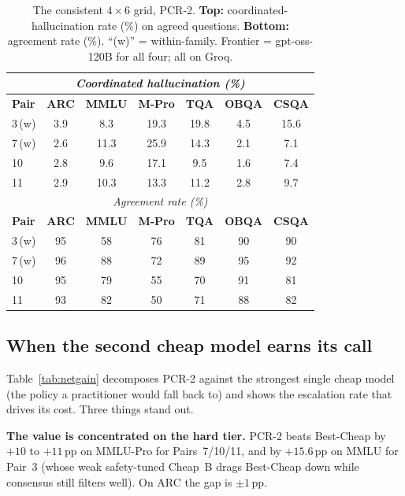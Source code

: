 \documentclass[conference]{IEEEtran}
\begin{document}
\begin{table}[!t]
\caption{The consistent $4\times6$ grid, PCR-2. \textbf{Top:}
coordinated-hallucination rate (\%) on agreed questions. \textbf{Bottom:}
agreement rate (\%). ``(w)'' = within-family. Frontier = gpt-oss-120B for all
four; all on Groq.}
\label{tab:percell}
\renewcommand{\arraystretch}{1.2}
\footnotesize
\setlength{\tabcolsep}{5pt}
\begin{tabular}{l c c c c c c}
\toprule
\multicolumn{7}{c}{\textit{Coordinated hallucination (\%)}} \\
\midrule
\textbf{Pair} & \textbf{ARC} & \textbf{MMLU} & \textbf{M-Pro} & \textbf{TQA} & \textbf{OBQA} & \textbf{CSQA} \\
\midrule
3\,{\footnotesize(w)} & 3.9 & 8.3 & 19.3 & 19.8 & 4.5 & 15.6 \\
7\,{\footnotesize(w)} & 2.6 & 11.3 & 25.9 & 14.3 & 2.1 & 7.1 \\
10 & 2.8 & 9.6 & 17.1 & 9.5 & 1.6 & 7.4 \\
11 & 2.9 & 10.3 & 13.3 & 11.2 & 2.8 & 9.7 \\
\midrule
\multicolumn{7}{c}{\textit{Agreement rate (\%)}} \\
\midrule
\textbf{Pair} & \textbf{ARC} & \textbf{MMLU} & \textbf{M-Pro} & \textbf{TQA} & \textbf{OBQA} & \textbf{CSQA} \\
\midrule
3\,{\footnotesize(w)} & 95 & 58 & 76 & 81 & 90 & 90 \\
7\,{\footnotesize(w)} & 96 & 88 & 72 & 89 & 95 & 92 \\
10 & 95 & 79 & 55 & 70 & 91 & 81 \\
11 & 93 & 82 & 50 & 71 & 88 & 82 \\
\bottomrule
\end{tabular}
\end{table}

\subsection{When the second cheap model earns its call}
\label{sec:earns}
Table~\ref{tab:netgain} decomposes PCR-2 against the strongest single cheap model
(the policy a practitioner would fall back to) and shows the escalation rate that
drives its cost. Three things stand out.

\textbf{The value is concentrated on the hard tier.} PCR-2 beats Best-Cheap by
$+10$ to $+11$\,pp on MMLU-Pro for Pairs~7/10/11, and by $+15.6$\,pp on MMLU for
Pair~3 (whose weak safety-tuned Cheap~B drags Best-Cheap down while consensus
still filters well). On ARC the gap is $\pm1$\,pp.
\end{document}
